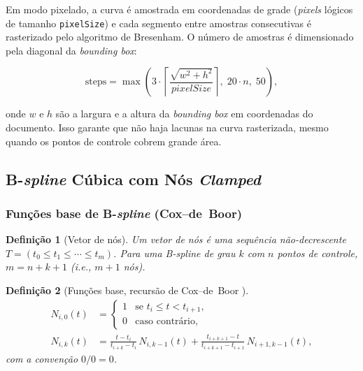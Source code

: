 \documentclass[12pt, a4paper]{article}
\newtheorem{defn}{Definição}[section]
\theoremstyle{remark}
\newcommand{\code}[1]{\texttt{#1}}
\begin{document}
Em modo pixelado, a curva é amostrada em coordenadas de grade
(\emph{pixels} lógicos de tamanho \code{pixelSize}) e cada segmento
entre amostras consecutivas é rasterizado pelo algoritmo de Bresenham.
O número de amostras é dimensionado pela diagonal da \emph{bounding box}:

\begin{equation}
    \text{steps} = \max\!\left(
        3 \cdot \left\lceil \frac{\sqrt{w^2+h^2}}{\mathit{pixelSize}} \right\rceil,\;
        20 \cdot n,\;
        50
    \right),
\end{equation}

onde $w$ e $h$ são a largura e a altura da \emph{bounding box} em
coordenadas do documento. Isso garante que não haja lacunas na curva
rasterizada, mesmo quando os pontos de controle cobrem grande área.

\subsection{B-\emph{spline} Cúbica com Nós \emph{Clamped}}

\subsubsection{Funções base de B-\emph{spline} (Cox–de~Boor)}

\begin{defn}[Vetor de nós]
Um \emph{vetor de nós} é uma sequência não-decrescente
$T = (t_0 \leq t_1 \leq \cdots \leq t_m)$.
Para uma B-\emph{spline} de grau $k$ com $n$ pontos de controle,
$m = n + k + 1$ (i.e., $m+1$ nós).
\end{defn}

\begin{defn}[Funções base, recursão de Cox–de~Boor \cite{cox1972,deboor1972}]
\begin{align}
    N_{i,0}(t) &=
    \begin{cases}
        1 & \text{se } t_i \leq t < t_{i+1}, \\
        0 & \text{caso contrário,}
    \end{cases} \\[6pt]
    N_{i,k}(t) &=
    \frac{t - t_i}{t_{i+k} - t_i}\,N_{i,k-1}(t)
    + \frac{t_{i+k+1} - t}{t_{i+k+1} - t_{i+1}}\,N_{i+1,k-1}(t),
    \label{eq:coxdeboor}
\end{align}
com a convenção $0/0 = 0$.
\end{defn}
\end{document}
